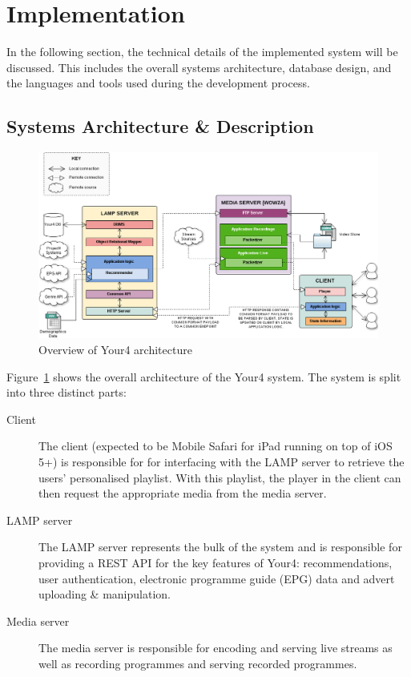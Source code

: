 \section{Implementation}

In the following section, the technical details of the implemented system will be discussed. This includes the overall systems architecture, database design, and the languages and tools used during the development process.

\subsection{Systems Architecture \& Description}

\begin{figure}[H]
	\centering
	\includegraphics[scale=0.4]{images/your4-architecture.png}
	\caption{Overview of Your4 architecture}
	\label{your4-architecture}
\end{figure}

Figure~\ref{your4-architecture} shows the overall architecture of the Your4 system. The system is split into three distinct parts:

\begin{description}
	\item[Client] The client (expected to be Mobile Safari for iPad running on top of iOS 5+) is responsible for for interfacing with the LAMP server to retrieve the users' personalised playlist. With this playlist, the player in the client can then request the appropriate media from the media server.
	\item[LAMP server] The LAMP server represents the bulk of the system and is responsible for providing a REST API for the key features of Your4: recommendations, user authentication, electronic programme guide (EPG) data and advert uploading \& manipulation.
	\item[Media server] The media server is responsible for encoding and serving live streams as well as recording programmes and serving recorded programmes.
\end{description}

